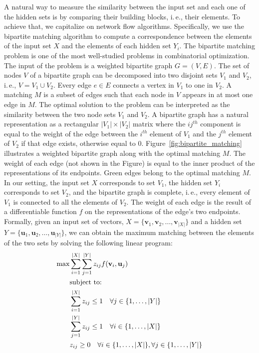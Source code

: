 \documentclass[twoside]{article}
\newcommand{\ie}{i.\,e., }
\begin{document}
A natural way to measure the similarity between the input set and each one of the hidden sets is by comparing their building blocks, \ie their elements.
To achieve that, we capitalize on network flow algorithms.
Specifically, we use the bipartite matching algorithm to compute a correspondence between the elements of the input set $X$ and the elements of each hidden set $Y_i$.
The bipartite matching problem is one of the most well-studied problems in combinatorial optimization.
The input of the problem is a weighted bipartite graph $G=(V, E)$.
The set of nodes $V$ of a bipartite graph can be decomposed into two disjoint sets $V_1$ and $V_2$, \ie $V=V_1 \cup V_2$.
Every edge $e \in E$ connects a vertex in $V_1$ to one in $V_2$.
A matching $M$ is a subset of edges such that each node in $V$ appears in at most one edge in $M$.
The optimal solution to the problem can be interpreted as the similarity between the two node sets $V_1$ and $V_2$.
A bipartite graph has a natural representation as a rectangular $|V_1| \times |V_2|$ matrix where the $ij^{th}$ component is equal to the weight of the edge between the $i^{th}$ element of $V_1$ and the $j^{th}$ element of $V_2$ if that edge exists, otherwise equal to $0$.
Figure~\ref{fig:bipartite_matching} illustrates a weighted bipartite graph along with the optimal matching $M$.
The weight of each edge (not shown in the Figure) is equal to the inner product of the representations of its endpoints.
Green edges belong to the optimal matching $M$.
In our setting, the input set $X$ corresponds to set $V_1$, the hidden set $Y_i$ corresponds to set $V_2$, and the bipartite graph is complete, \ie every element of $V_1$ is connected to all the elements of $V_2$.
The weight of each edge is the result of a differentiable function $f$ on the representations of the edge's two endpoints.
Formally, given an input set of vectors, $X = \{ \mathbf{v}_1, \mathbf{v}_2, \ldots, \mathbf{v}_{|X|} \}$ and a hidden set $Y = \{ \mathbf{u}_1, \mathbf{u}_2, \ldots, \mathbf{u}_{|Y|} \}$, we can obtain the maximum matching between the elements of the two sets by solving the following linear program:
\begin{equation}
\begin{split}
  \max \displaystyle & \sum_{i=1}^{|X|} \sum_{j=1}^{|Y|} z_{ij} f(\mathbf{v}_i, \mathbf{u}_j) \\
  & \textrm{subject to:} \\
  & \sum_{i=1}^{|X|} z_{ij} \leq 1 \quad \forall j \in \{ 1,\ldots,|Y| \} \\
  & \sum_{j=1}^{|Y|} z_{ij} \leq 1 \quad \forall i \in \{ 1,\ldots,|X| \} \\
  & z_{ij} \geq 0 \quad \forall i \in \{ 1,\ldots,|X| \}, \forall j \in \{ 1,\ldots,|Y| \} \\ 
\end{split}
\label{eq:bipartite_primal}
\end{equation}
\end{document}
